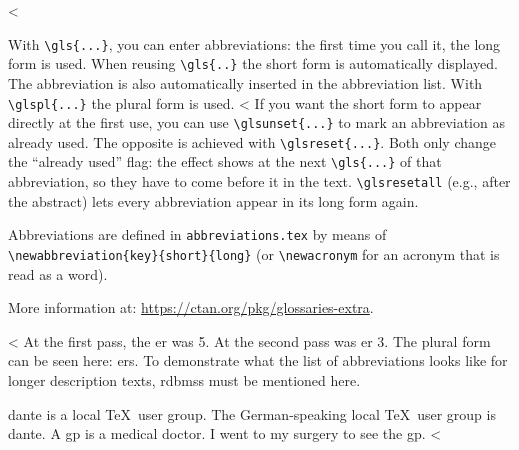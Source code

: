 <%

With \verb+\gls{...}+, you can enter abbreviations: the first time you call it, the long form is used.
When reusing \verb+\gls{..}+ the short form is automatically displayed.
The abbreviation is also automatically inserted in the abbreviation list.
With \verb+\glspl{...}+ the plural form is used.
<%
If you want the short form to appear directly at the first use, you can use \verb+\glsunset{...}+ to mark an abbreviation as already used.
The opposite is achieved with \verb+\glsreset{...}+.
Both only change the ``already used'' flag: the effect shows at the next \verb+\gls{...}+ of that abbreviation, so they have to come before it in the text.
\verb+\glsresetall+ (e.g., after the abstract) lets every abbreviation appear in its long form again.

Abbreviations are defined in \verb+abbreviations.tex+ by means of \verb+\newabbreviation{key}{short}{long}+ (or \verb+\newacronym+ for an acronym that is read as a word).

More information at: \url{https://ctan.org/pkg/glossaries-extra}.

<%
At the first pass, the \gls{er} was 5.
At the second pass was \gls{er} 3.
The plural form can be seen here: \glspl{er}.
To demonstrate what the list of abbreviations looks like for longer description texts, \glspl{rdbms} must be mentioned here.

\gls{dante} is a local \TeX\ user group.
The German-speaking local \TeX\ user group is \gls{dante}.
A \gls{gp} is a medical doctor.
I went to my surgery to see the \gls{gp}.
<%

